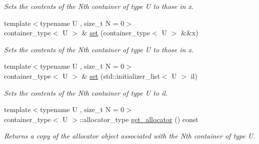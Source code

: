 \begin{DoxyCompactItemize}
\begin{DoxyCompactList}\small\item\em Sets the contents of the Nth container of type U to those in x. \end{DoxyCompactList}\item 
\hypertarget{classheterogeneous_1_1heterodeque_3_01_t_00_01_types_8_8_8_4_ac96baf84dc82c91c304992d4e3cb8bc0}{}{\footnotesize template$<$typename U , size\+\_\+t N = 0$>$ }\\container\+\_\+type$<$ U $>$ \& \hyperlink{classheterogeneous_1_1heterodeque_3_01_t_00_01_types_8_8_8_4_ac96baf84dc82c91c304992d4e3cb8bc0}{set} (container\+\_\+type$<$ U $>$ \&\&x)\label{classheterogeneous_1_1heterodeque_3_01_t_00_01_types_8_8_8_4_ac96baf84dc82c91c304992d4e3cb8bc0}

\begin{DoxyCompactList}\small\item\em Sets the contents of the Nth container of type U to those in x. \end{DoxyCompactList}\item 
\hypertarget{classheterogeneous_1_1heterodeque_3_01_t_00_01_types_8_8_8_4_a9bb71cd278399d2b6c9ecfbed17fde40}{}{\footnotesize template$<$typename U , size\+\_\+t N = 0$>$ }\\container\+\_\+type$<$ U $>$ \& \hyperlink{classheterogeneous_1_1heterodeque_3_01_t_00_01_types_8_8_8_4_a9bb71cd278399d2b6c9ecfbed17fde40}{set} (std\+::initializer\+\_\+list$<$ U $>$ il)\label{classheterogeneous_1_1heterodeque_3_01_t_00_01_types_8_8_8_4_a9bb71cd278399d2b6c9ecfbed17fde40}

\begin{DoxyCompactList}\small\item\em Sets the contents of the Nth container of type U to il. \end{DoxyCompactList}\item 
\hypertarget{classheterogeneous_1_1heterodeque_3_01_t_00_01_types_8_8_8_4_a539c7ea552909eabd2f3680bd2e3949a}{}{\footnotesize template$<$typename U , size\+\_\+t N = 0$>$ }\\container\+\_\+type$<$ U $>$\+::allocator\+\_\+type \hyperlink{classheterogeneous_1_1heterodeque_3_01_t_00_01_types_8_8_8_4_a539c7ea552909eabd2f3680bd2e3949a}{get\+\_\+allocator} () const \label{classheterogeneous_1_1heterodeque_3_01_t_00_01_types_8_8_8_4_a539c7ea552909eabd2f3680bd2e3949a}

\begin{DoxyCompactList}\small\item\em Returns a copy of the allocator object associated with the Nth container of type U. \end{DoxyCompactList}\end{DoxyCompactItemize}
